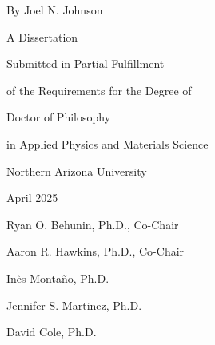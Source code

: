 \begin{centering}
\begin{large}
\begin{spacing}{1.8}

\vspace*{\baselineskip}

\dissertationTitle{}

\thispagestyle{empty} %

\vspace{\baselineskip}

By Joel N. Johnson

\vspace{10mm}

A Dissertation

Submitted in Partial Fulfillment

of the Requirements for the Degree of

\vspace{10mm}

Doctor of Philosophy

in Applied Physics and Materials Science

\vspace{\baselineskip}

Northern Arizona University

April 2025

\vspace{2\baselineskip}


Ryan O. Behunin, Ph.D., Co-Chair

Aaron R. Hawkins, Ph.D., Co-Chair

Inès Montaño, Ph.D.

Jennifer S. Martinez, Ph.D.

David Cole, Ph.D.

\end{spacing}
\end{large}
\end{centering}
